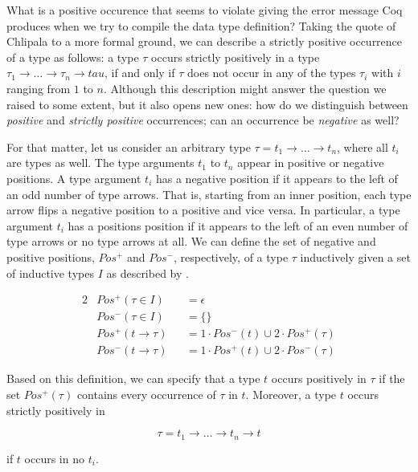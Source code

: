 \begin{excursus}
What is a positive occurence that  seems to violate giving
the error message Coq produces when we try to compile the data type
definition?
Taking the quote of Chlipala to a more formal ground, we can describe
a strictly positive occurrence of a type as follows: a type $\tau$
occurs strictly positively in a type $\tau_1\rightarrow \dots
\rightarrow \tau_n \rightarrow tau$, if and only if $\tau$ does not
occur in any of the types $\tau_i$ with $i$ ranging from $1$ to $n$.
Although this description might answer the question we raised to some
extent, but it also opens new ones: how do we distinguish between
\emph{positive} and \emph{strictly positive} occurrences; can an
occurrence be \emph{negative} as well?

For that matter, let us consider an arbitrary type $\tau = t_1
\rightarrow \dots \rightarrow t_n$, where all $t_i$ are types as well.
The type arguments $t_1$ to $t_n$ appear in positive or negative
positions.
A type argument $t_i$ has a negative position if it appears to the
left of an odd number of type arrows.
That is, starting from an inner position, each type arrow flips a
negative position to a positive and vice versa.
In particular, a type argument $t_i$ has a positions position if it
appears to the left of an even number of type arrows or no type arrows
at all.
We can define the set of negative and positive positions, $Pos^{+}$
and $Pos^{-}$, respectively, of a type $\tau$ inductively given a set of
inductive types $I$ as described by
\citet{blanqui2002inductivedatatype}.

\begin{alignat*}{2}
  &Pos^{+} (\tau \in I) &&= \epsilon\\
  &Pos^{-} (\tau \in I) &&= \{\}\\
  &Pos^{+} (t \rightarrow \tau) &&= 1 \cdot Pos^{-} (t) \cup 2 \cdot Pos^{+} (\tau)\\
  &Pos^{-} (t \rightarrow \tau) &&= 1 \cdot Pos^{+} (t) \cup 2 \cdot Pos^{-} (\tau)
\end{alignat*}

Based on this definition, we can specify that a type $t$ occurs
positively in $\tau$ if the set $Pos^{+} (\tau)$ contains every occurrence of $\tau$ in
$t$.
Moreover, a type $t$ occurs strictly positively in

\[
\tau = t_1 \rightarrow \dots \rightarrow t_n \rightarrow t
\]

if $t$ occurs in no $t_i$.


\end{excursus}
